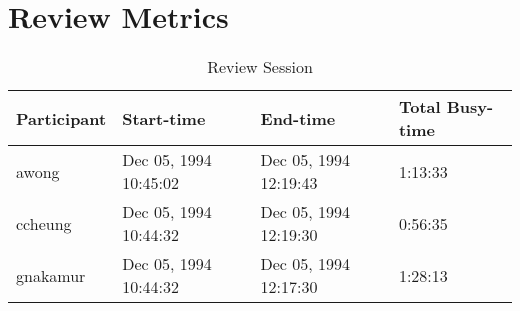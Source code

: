 \section{Review Metrics}
\begin{table}[hb]
\begin{center}
\begin{tabular}{|l|l|l|l|}
\hline
Participant & Start-time & End-time & Total Busy-time \\
\hline
awong & Dec 05, 1994 10:45:02 & Dec 05, 1994 12:19:43 & 1:13:33 \\
ccheung & Dec 05, 1994 10:44:32 & Dec 05, 1994 12:19:30 & 0:56:35 \\
gnakamur & Dec 05, 1994 10:44:32 & Dec 05, 1994 12:17:30 & 1:28:13 \\
\hline
\end{tabular}
\end{center}
\caption{Review Session}
\end{table}


